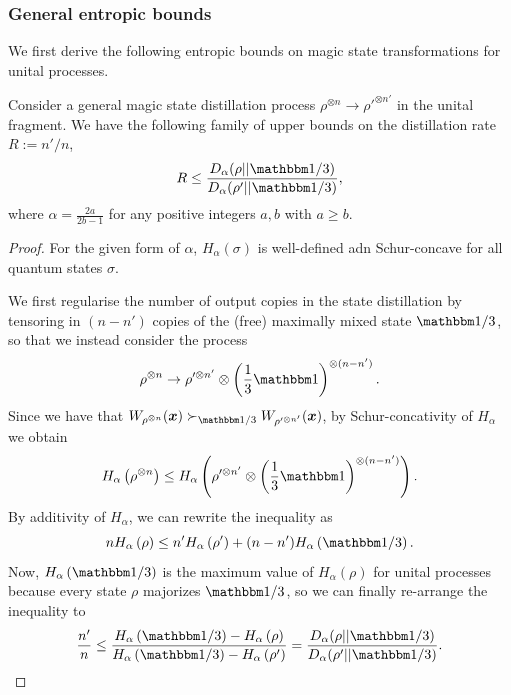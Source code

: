 \documentclass[pra,
aps,
twocolumn,
superscriptaddress,
groupedaddress,
nofootinbib,
reprint
]{revtex4-1}
\begin{document}
\subsubsection{General entropic bounds}

We first derive the following entropic bounds on magic state transformations for unital processes.
\begin{theorem}
	Consider a general magic state distillation process $\rho^{\otimes n} \rightarrow \rho'^{\otimes n'}$	in the unital fragment.
	We have the following family of upper bounds on the distillation rate $R := n'/n$,
	\begin{equation}
		R \leq \frac{D_{\alpha}(\rho||\id/3)}{D_{\alpha}(\rho'||\id/3)},
	\end{equation}
	where $\alpha = \frac{2a}{2b-1}$ for any positive integers $a,b$ with $a \geq b$.
\end{theorem}
\begin{proof}
	For the given form of $\alpha$, $H_\alpha(\sigma)$ is well-defined adn Schur-concave for all quantum states $\sigma$.
	
	We first regularise the number of output copies in the state distillation by tensoring in $(n-n')$ copies of the (free) maximally mixed state $\id/3$, so that we instead consider the process
\begin{equation}
	\rho^{\otimes n} \rightarrow \rho'^{\otimes n'} \otimes \left( \frac{1}{3}\id \right)^{\otimes (n - n')}.
\end{equation}
Since we have that $W_{\rho^{\otimes n}}(\bmx) \succ_{\id/3} W_{\rho'^{\otimes n'}}(\bmx)$, by Schur-concativity of $H_\alpha$ we obtain
\begin{equation}
	H_\alpha \left( \rho^{\otimes n} \right) \leq H_\alpha \left( \rho'^{\otimes n'} \otimes \left( \frac{1}{3}\id \right)^{\otimes (n - n')} \right).
\end{equation}
By additivity of $H_\alpha$, we can rewrite the inequality as
\begin{equation}
	n H_\alpha \left( \rho \right) \leq n' H_\alpha \left( \rho' \right) + (n - n') H_\alpha \left( \id/3 \right).
\end{equation}
Now, $H_\alpha \left( \id/3 \right)$ is the maximum value of $H_\alpha(\rho)$ for unital processes because every state $\rho$ majorizes $\id/3$, so we can finally re-arrange the inequality to
\begin{equation}
	\frac{n'}{n} \leq \frac{H_\alpha \left( \id/3 \right) - H_\alpha \left( \rho \right)}{H_\alpha \left( \id/3 \right) - H_\alpha \left( \rho' \right)} = \frac{D_{\alpha}(\rho||\id/3)}{D_{\alpha}(\rho'||\id/3)}.
\end{equation}
\end{proof}
\end{document}
